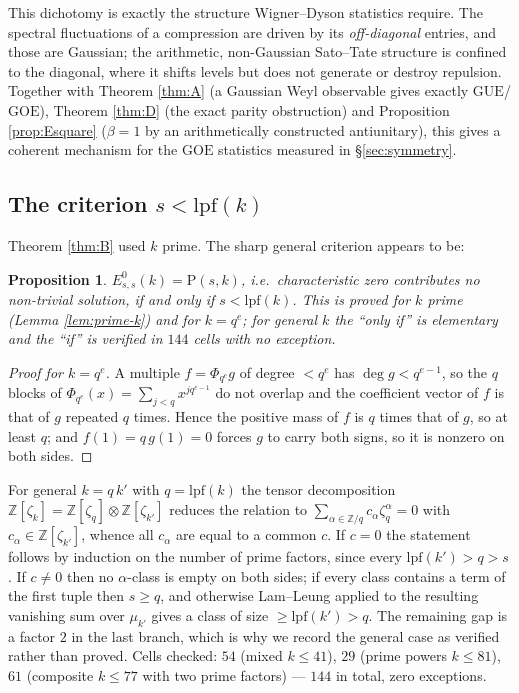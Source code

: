 \documentclass[11pt,reqno]{amsart}
\newtheorem{proposition}[theorem]{Proposition}
\theoremstyle{definition}
\newcommand{\ZZ}{\mathbb{Z}}
\newcommand{\GUE}{\mathrm{GUE}}
\newcommand{\GOE}{\mathrm{GOE}}
\begin{document}
This dichotomy is exactly the structure Wigner--Dyson statistics require. The
spectral fluctuations of a compression are driven by its \emph{off-diagonal}
entries, and those are Gaussian; the arithmetic, non-Gaussian Sato--Tate
structure is confined to the diagonal, where it shifts levels but does not
generate or destroy repulsion. Together with Theorem \ref{thm:A} (a Gaussian
Weyl observable gives exactly $\GUE$/$\GOE$), Theorem \ref{thm:D} (the exact
parity obstruction) and Proposition \ref{prop:Esquare} ($\beta=1$ by an
arithmetically constructed antiunitary), this gives a coherent mechanism for the
$\GOE$ statistics measured in \S\ref{sec:symmetry}.

\subsection{The criterion \texorpdfstring{$s<\mathrm{lpf}(k)$}{s < lpf(k)}}

Theorem \ref{thm:B} used $k$ prime. The sharp general criterion appears to be:

\begin{proposition}\label{prop:lpf}
$E^0_{s,s}(k)=\mathrm{P}(s,k)$, i.e.\ characteristic zero contributes no
non-trivial solution, if and only if $s<\mathrm{lpf}(k)$. This is proved for $k$
prime (Lemma \ref{lem:prime-k}) and for $k=q^e$; for general $k$ the ``only if''
is elementary and the ``if'' is verified in $144$ cells with no exception.
\end{proposition}
\begin{proof}[Proof for $k=q^e$]
A multiple $f=\Phi_{q^e}g$ of degree $<q^e$ has $\deg g<q^{e-1}$, so the $q$
blocks of $\Phi_{q^e}(x)=\sum_{j<q}x^{jq^{e-1}}$ do not overlap and the
coefficient vector of $f$ is that of $g$ repeated $q$ times. Hence the positive
mass of $f$ is $q$ times that of $g$, so at least $q$; and $f(1)=q\,g(1)=0$
forces $g$ to carry both signs, so it is nonzero on both sides.
\end{proof}

For general $k=q\,k'$ with $q=\mathrm{lpf}(k)$ the tensor decomposition
$\ZZ[\zeta_k]=\ZZ[\zeta_q]\otimes\ZZ[\zeta_{k'}]$ reduces the relation to
$\sum_{\alpha\in\ZZ/q}c_\alpha\zeta_q^\alpha=0$ with
$c_\alpha\in\ZZ[\zeta_{k'}]$, whence all $c_\alpha$ are equal to a common $c$.
If $c=0$ the statement follows by induction on the number of prime factors, since
every $\mathrm{lpf}(k')>q>s$. If $c\neq0$ then no $\alpha$-class is empty on both
sides; if every class contains a term of the first tuple then $s\ge q$, and
otherwise Lam--Leung applied to the resulting vanishing sum over $\mu_{k'}$ gives
a class of size $\ge\mathrm{lpf}(k')>q$. The remaining gap is a factor $2$ in the
last branch, which is why we record the general case as verified rather than
proved. Cells checked: $54$ (mixed $k\le41$), $29$ (prime powers
$k\le81$), $61$ (composite $k\le77$ with two prime factors) --- $144$ in total,
zero exceptions.
\end{document}
